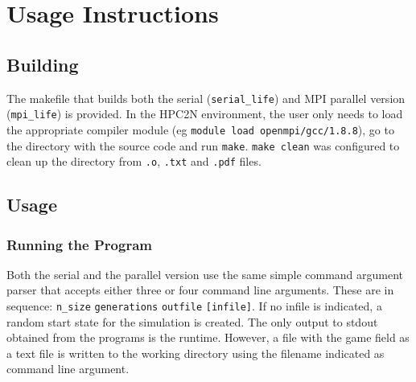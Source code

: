 \documentclass[a4paper,11pt,twoside,table,xcdraw]{article}
\begin{document}
\section{Usage Instructions}
\subsection{Building}
The makefile that builds both the serial (\verb+serial_life+) and MPI parallel version (\verb+mpi_life+) is provided. In the HPC2N environment, the user only needs to load the appropriate compiler module (eg \verb+module load openmpi/gcc/1.8.8+), go to the directory with the source code and run \verb+make+. \verb+make clean+ was configured to clean up the directory from \verb+.o+, \verb+.txt+ and \verb+.pdf+ files. 

\subsection{Usage}

\subsubsection{Running the Program}
Both the serial and the parallel version use the same simple command argument parser that accepts either three or four command line arguments. These are in sequence: \verb+n_size+ \verb+generations+ \verb+outfile+ \verb+[infile]+. If no infile is indicated, a random start state for the simulation is created. The only output to stdout obtained from the programs is the runtime. However, a file with the game field as a text file is written to the working directory using the filename indicated as command line argument.
\end{document}
